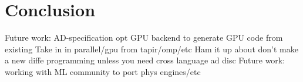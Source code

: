 \section{Conclusion}
\label{sec:conclusion}

 Future work: AD-specification opt
 GPU backend to generate GPU code from existing
 Take in in parallel/gpu from tapir/omp/etc
 Ham it up about don't make a new diffe programming unless you need
 cross language ad disc
 Future work: working with ML community to port phys engines/etc